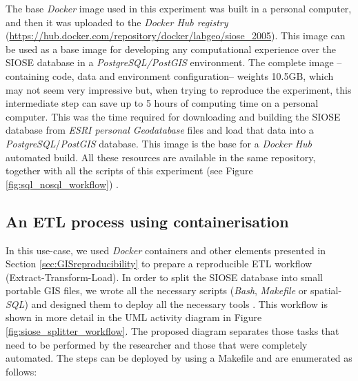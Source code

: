 \documentclass[ijgi,article,submit,moreauthors,pdftex]{Definitions/mdpi}
\begin{document}
The base \textit{Docker} image used in this experiment was built in a personal computer, and then it was uploaded to the \textit{Docker Hub registry} (\url{https://hub.docker.com/repository/docker/labgeo/siose\_2005}). This image can be used as a base image for developing any computational experience over the SIOSE database in a \textit{PostgreSQL/PostGIS} environment. The complete image --containing code, data and environment configuration-- weights 10.5GB, which may not seem very impressive but, when trying to reproduce the experiment, this intermediate step can save up to 5 hours of computing time on a personal computer. This was the time required for downloading and building the SIOSE database from \textit{ESRI personal Geodatabase} files and load that data into a \textit{PostgreSQL}/\textit{PostGIS} database. This image is the base for a \textit{Docker Hub} automated build. All these resources are available in the same repository, together with all the scripts of this experiment (see Figure \ref{fig:sql_nosql_workflow}) \cite{benito_m_zaragozi_2020_3631365}.


\subsection{An ETL process using containerisation}
\label{subsec:siose_splitter}

In this use-case, we used \textit{Docker} containers and other elements presented in Section \ref{sec:GISreproducibility} to prepare a reproducible ETL workflow (Extract-Transform-Load). In order to split the SIOSE database into small portable GIS files, we wrote all the necessary scripts (\textit{Bash}, \textit{Makefile} or spatial-\textit{SQL}) and designed them to deploy all the necessary tools \cite{benito_m_zaragozi_2020_3631365}. This workflow is shown in more detail in the UML activity diagram in Figure \ref{fig:siose_splitter_workflow}. The proposed diagram separates those tasks that need to be performed by the researcher and those that were completely automated. The steps can be deployed by using a Makefile and are enumerated as follows:
\end{document}
